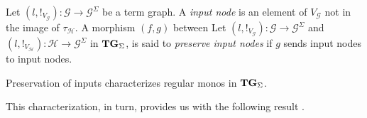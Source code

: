 \documentclass[a4paper,UKenglish,cleveref,pdftex,thm-restate,numberwithinsect]{lipics-v2021}
\newcommand{\catname}[1]{\textbf{\textup{#1}}}
\newcommand{\hyp}{\catname{Hyp}}
\newcommand{\tg}[0]{\catname{TG}_{\Sigma}}
\newcommand{\commentato}[1]{ {} }
\begin{document}
\begin{definition}
	Let $(l, !_{V_{\mathcal{G}}})\colon \mathcal{G}\to \mathcal{G}^{\Sigma}$  be a term graph. A \emph{input node} is an element of $V_{\mathcal{G}}$ not in the image of $\tau_{\mathcal{H}}$.  A morphism $(f,g)$ between
	Let $(l, !_{V_{\mathcal{G}}})\colon \mathcal{G}\to \mathcal{G}^{\Sigma}$ and $(l, !_{V_{\mathcal{H}}})\colon \mathcal{H}\to \mathcal{G}^{\Sigma}$ in $\tg$, is said to \emph{preserve input nodes} if $g$ sends input nodes to input nodes.
\end{definition}

\commentato{
\todo{Se questo remark sotto non serve nel pezzo sulle equivalenze possiamo toglierlo}
\begin{remark}\label{prop:image}
	Suppose that $(f,g)\colon (l, !_{V_{\mathcal{G}}})\to (l', !_{V_{\mathcal{H}}})$ preserves input nodes. Then  if $\tau_{\mathcal{H}}(h)=g(v)$ for some $v\in V_{\mathcal{G}}$ then $h$ belongs to the image of $f$. Indeed, by hypothesis $v$ must be in the image of $\tau_{\mathcal{G}}$ and so there exists $k$ such that $\tau_{\mathcal{G}}(k)=v$. But then $\tau_{\mathcal{H}}(f(k))=g(v)$ and we can conclude that $f(k)=h$.
\end{remark}
}

Preservation of inputs characterizes regular monos in $\tg$.


This characterization, in turn, provides us with the following result \cite{CastelnovoGM24,castelnovo2023thesis}. 

\end{document}
